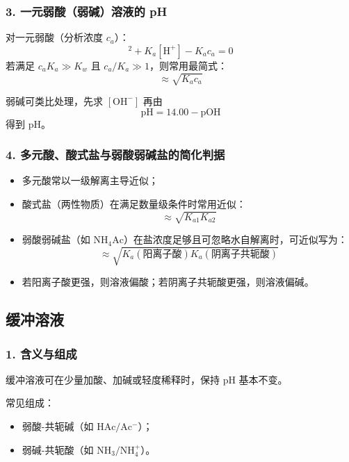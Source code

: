 \documentclass[12pt,a4paper]{article}
\numberwithin{equation}{section}
\begin{document}
\subsubsection{3. 一元弱酸（弱碱）溶液的 pH}
对一元弱酸（分析浓度 $c_a$）：
\begin{equation}
[\mathrm{H^+}]^2+K_a[\mathrm{H^+}]-K_ac_a=0
\end{equation}
若满足 $c_aK_a\gg K_w$ 且 $c_a/K_a\gg 1$，则常用最简式：
\begin{equation}
[\mathrm{H^+}]\approx \sqrt{K_ac_a}
\end{equation}

弱碱可类比处理，先求 $[\mathrm{OH^-}]$ 再由
\begin{equation}
\mathrm{pH}=14.00-\mathrm{pOH}
\end{equation}
得到 pH。

\subsubsection{4. 多元酸、酸式盐与弱酸弱碱盐的简化判据}
\begin{itemize}
    \item 多元酸常以一级解离主导近似；
    \item 酸式盐（两性物质）在满足数量级条件时常用近似：
\begin{equation}
[\mathrm{H^+}]\approx \sqrt{K_{a1}K_{a2}}
\end{equation}
    \item 弱酸弱碱盐（如 $\mathrm{NH_4Ac}$）在盐浓度足够且可忽略水自解离时，可近似写为：
\begin{equation}
[\mathrm{H^+}]\approx \sqrt{K_a(\text{阳离子酸})K_a(\text{阴离子共轭酸})}
\end{equation}
    \item 若阳离子酸更强，则溶液偏酸；若阴离子共轭酸更强，则溶液偏碱。
\end{itemize}

\subsection{缓冲溶液}

\subsubsection{1. 含义与组成}
缓冲溶液可在少量加酸、加碱或轻度稀释时，保持 pH 基本不变。

常见组成：
\begin{itemize}
    \item 弱酸-共轭碱（如 $\mathrm{HAc/Ac^-}$）；
    \item 弱碱-共轭酸（如 $\mathrm{NH_3/NH_4^+}$）。
\end{itemize}
\end{document}
